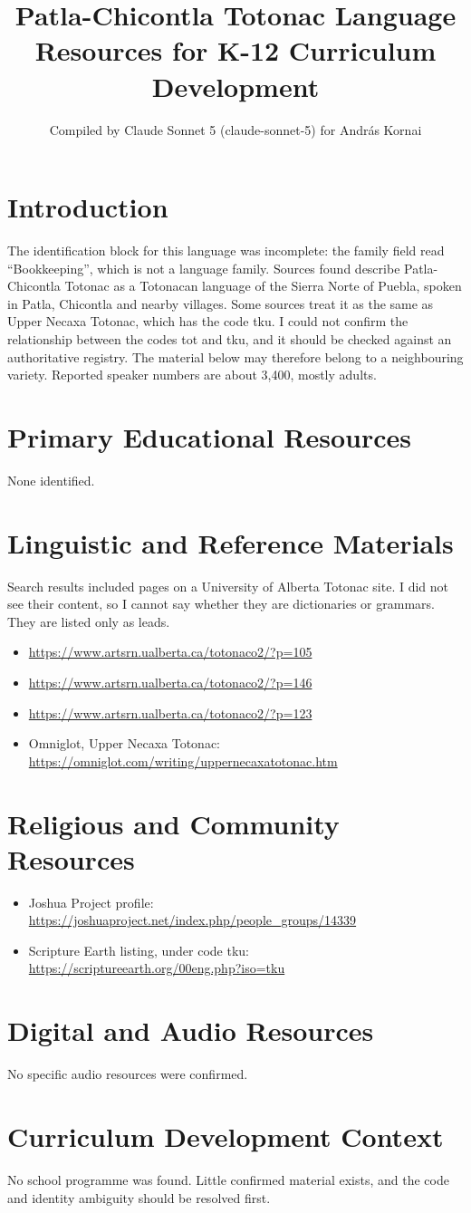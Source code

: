 \documentclass[12pt]{article}
\title{Patla-Chicontla Totonac Language Resources for K-12 Curriculum Development}
\author{Compiled by Claude Sonnet 5 (claude-sonnet-5) for Andr\'as Kornai}
\date{}
\begin{document}
\maketitle

\section{Introduction}
The identification block for this language was incomplete: the family field read ``Bookkeeping'', which is not a language family. Sources found describe Patla-Chicontla Totonac as a Totonacan language of the Sierra Norte of Puebla, spoken in Patla, Chicontla and nearby villages. Some sources treat it as the same as Upper Necaxa Totonac, which has the code tku. I could not confirm the relationship between the codes tot and tku, and it should be checked against an authoritative registry. The material below may therefore belong to a neighbouring variety. Reported speaker numbers are about 3,400, mostly adults.

\section{Primary Educational Resources}
None identified.

\section{Linguistic and Reference Materials}
Search results included pages on a University of Alberta Totonac site. I did not see their content, so I cannot say whether they are dictionaries or grammars. They are listed only as leads.
\begin{itemize}
\item \url{https://www.artsrn.ualberta.ca/totonaco2/?p=105}
\item \url{https://www.artsrn.ualberta.ca/totonaco2/?p=146}
\item \url{https://www.artsrn.ualberta.ca/totonaco2/?p=123}
\item Omniglot, Upper Necaxa Totonac: \url{https://omniglot.com/writing/uppernecaxatotonac.htm}
\end{itemize}

\section{Religious and Community Resources}
\begin{itemize}
\item Joshua Project profile: \url{https://joshuaproject.net/index.php/people_groups/14339}
\item Scripture Earth listing, under code tku: \url{https://scriptureearth.org/00eng.php?iso=tku}
\end{itemize}

\section{Digital and Audio Resources}
No specific audio resources were confirmed.

\section{Curriculum Development Context}
No school programme was found. Little confirmed material exists, and the code and identity ambiguity should be resolved first.
\end{document}
